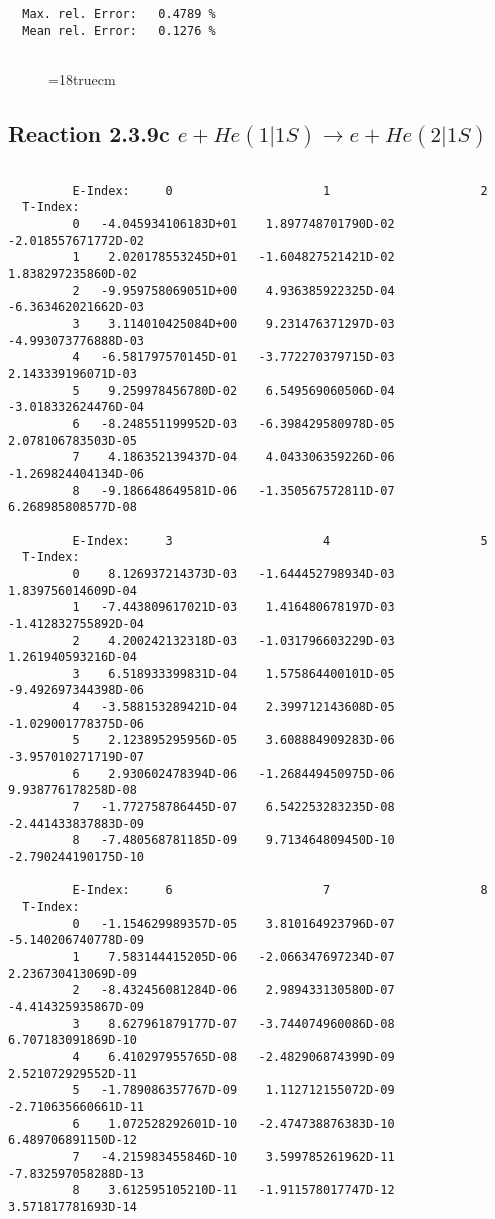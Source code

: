 \begin{verbatim}
  Max. rel. Error:   0.4789 %
  Mean rel. Error:   0.1276 %


\end{verbatim}
\begin{figure} \label{2.3.9b}
\epsfxsize=18truecm
\end{figure}
\newpage


\subsection{
Reaction 2.3.9c  $e + He(1|1S) \rightarrow e + He(2|1S) $
}



\begin{verbatim}

         E-Index:     0                     1                     2
  T-Index:
         0   -4.045934106183D+01    1.897748701790D-02   -2.018557671772D-02
         1    2.020178553245D+01   -1.604827521421D-02    1.838297235860D-02
         2   -9.959758069051D+00    4.936385922325D-04   -6.363462021662D-03
         3    3.114010425084D+00    9.231476371297D-03   -4.993073776888D-03
         4   -6.581797570145D-01   -3.772270379715D-03    2.143339196071D-03
         5    9.259978456780D-02    6.549569060506D-04   -3.018332624476D-04
         6   -8.248551199952D-03   -6.398429580978D-05    2.078106783503D-05
         7    4.186352139437D-04    4.043306359226D-06   -1.269824404134D-06
         8   -9.186648649581D-06   -1.350567572811D-07    6.268985808577D-08

         E-Index:     3                     4                     5
  T-Index:
         0    8.126937214373D-03   -1.644452798934D-03    1.839756014609D-04
         1   -7.443809617021D-03    1.416480678197D-03   -1.412832755892D-04
         2    4.200242132318D-03   -1.031796603229D-03    1.261940593216D-04
         3    6.518933399831D-04    1.575864400101D-05   -9.492697344398D-06
         4   -3.588153289421D-04    2.399712143608D-05   -1.029001778375D-06
         5    2.123895295956D-05    3.608884909283D-06   -3.957010271719D-07
         6    2.930602478394D-06   -1.268449450975D-06    9.938776178258D-08
         7   -1.772758786445D-07    6.542253283235D-08   -2.441433837883D-09
         8   -7.480568781185D-09    9.713464809450D-10   -2.790244190175D-10

         E-Index:     6                     7                     8
  T-Index:
         0   -1.154629989357D-05    3.810164923796D-07   -5.140206740778D-09
         1    7.583144415205D-06   -2.066347697234D-07    2.236730413069D-09
         2   -8.432456081284D-06    2.989433130580D-07   -4.414325935867D-09
         3    8.627961879177D-07   -3.744074960086D-08    6.707183091869D-10
         4    6.410297955765D-08   -2.482906874399D-09    2.521072929552D-11
         5   -1.789086357767D-09    1.112712155072D-09   -2.710635660661D-11
         6    1.072528292601D-10   -2.474738876383D-10    6.489706891150D-12
         7   -4.215983455846D-10    3.599785261962D-11   -7.832597058288D-13
         8    3.612595105210D-11   -1.911578017747D-12    3.571817781693D-14


\end{verbatim}
